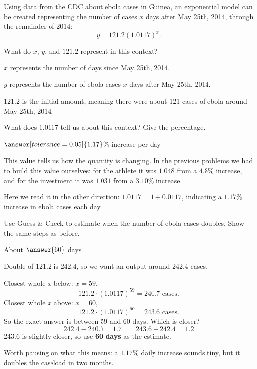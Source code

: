 \documentclass[12pt]{ximera}
\begin{document}
Using data from the CDC about ebola cases in Guinea, an exponential model can be created
representing the number of cases $x$ days after May 25th, 2014, through the remainder of
2014:
\[
y = 121.2(1.0117)^x.
\]

\begin{problem}
What do $x$, $y$, and $121.2$ represent in this context?

\begin{freeResponse}
\end{freeResponse}

\begin{solution}
$x$ represents the number of days since May 25th, 2014.

$y$ represents the number of ebola cases $x$ days after May 25th, 2014.

$121.2$ is the initial amount, meaning there were about 121 cases of ebola around May
25th, 2014.
\end{solution}
\end{problem}

\begin{problem}
What does $1.0117$ tell us about this context? Give the percentage.

$\answer[tolerance=0.05]{1.17}$\% increase per day

\begin{freeResponse}
\end{freeResponse}

\begin{solution}
This value tells us how the quantity is changing. In the previous problems we had to
build this value ourselves: for the athlete it was $1.048$ from a $4.8\%$ increase, and
for the investment it was $1.031$ from a $3.10\%$ increase.

Here we read it in the other direction: $1.0117 = 1 + 0.0117$, indicating a $1.17\%$
increase in ebola cases each day.
\end{solution}
\end{problem}

\begin{problem}
Use Guess \& Check to estimate when the number of ebola cases doubles. Show the same
steps as before.

About $\answer{60}$ days

\begin{freeResponse}
\end{freeResponse}

\begin{solution}
Double of $121.2$ is $242.4$, so we want an output around 242.4 cases.

Closest whole $x$ below: $x = 59$,
\[
121.2 \cdot (1.0117)^{59} = 240.7 \text{ cases}.
\]
Closest whole $x$ above: $x = 60$,
\[
121.2 \cdot (1.0117)^{60} = 243.6 \text{ cases}.
\]
So the exact answer is between 59 and 60 days. Which is closer?
\[
242.4 - 240.7 = 1.7 \qquad 243.6 - 242.4 = 1.2
\]
243.6 is slightly closer, so use \textbf{60 days} as the estimate.

Worth pausing on what this means: a $1.17\%$ daily increase sounds tiny, but it doubles
the caseload in two months.
\end{solution}
\end{problem}
\end{document}
